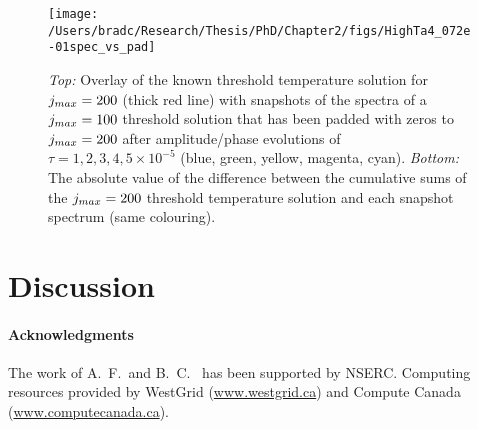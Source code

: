 \documentclass[../PhD.tex]{subfiles}
\begin{document}
\begin{figure}[ht]
	\centering
	\texttt{[image: /Users/bradc/Research/Thesis/PhD/Chapter2/figs/HighTa4\_072e-01spec\_vs\_pad]}
	\caption{{\it Top:} Overlay of the known threshold temperature solution for $j_{max} = 200$ (thick red line) with snapshots of the spectra of a $j_{max} = 100$ threshold solution that has been padded with zeros to $j_{max} = 200$ after amplitude/phase evolutions of $\tau =1, 2, 3, 4, 5 \times 10^{-5}$ (blue, green, yellow, magenta, cyan). {\it Bottom:} The absolute value of the difference between the cumulative sums of the $j_{max} = 200$ threshold temperature solution and each snapshot spectrum (same colouring).}
	\label{fig: HighTa4_072e-01spec_vs_pad}
\end{figure}


\section{Discussion}
\label{sec: discussion}


\paragraph*{Acknowledgments}The work of A.~F.~and B.~C.~ has been supported by NSERC. Computing resources provided by WestGrid (\href{www.westgrid.ca}{www.westgrid.ca}) and Compute Canada (\href{www.computecanada.ca}{www.computecanada.ca}).


\end{document}
